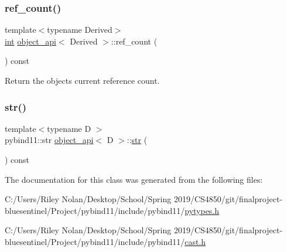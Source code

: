 \subsubsection{\texorpdfstring{ref\_count()}{ref\_count()}}
{\footnotesize\ttfamily template$<$typename Derived$>$ \\
\mbox{\hyperlink{warnings_8h_a74f207b5aa4ba51c3a2ad59b219a423b}{int}} \mbox{\hyperlink{classobject__api}{object\+\_\+api}}$<$ Derived $>$\+::ref\+\_\+count (\begin{DoxyParamCaption}{ }\end{DoxyParamCaption}) const\hspace{0.3cm}{\ttfamily [inline]}}



Return the object\textquotesingle{}s current reference count. 

\mbox{\label{classobject__api_afcae7cc760d93c39ae46192c2545f371}} 
\subsubsection{\texorpdfstring{str()}{str()}}
{\footnotesize\ttfamily template$<$typename D $>$ \\
pybind11\+::str \mbox{\hyperlink{classobject__api}{object\+\_\+api}}$<$ D $>$\+::\mbox{\hyperlink{classstr}{str}} (\begin{DoxyParamCaption}{ }\end{DoxyParamCaption}) const}



The documentation for this class was generated from the following files\+:\begin{DoxyCompactItemize}
\item 
C\+:/\+Users/\+Riley Nolan/\+Desktop/\+School/\+Spring 2019/\+C\+S4850/git/finalproject-\/bluesentinel/\+Project/pybind11/include/pybind11/\mbox{\hyperlink{pytypes_8h}{pytypes.\+h}}\item 
C\+:/\+Users/\+Riley Nolan/\+Desktop/\+School/\+Spring 2019/\+C\+S4850/git/finalproject-\/bluesentinel/\+Project/pybind11/include/pybind11/\mbox{\hyperlink{cast_8h}{cast.\+h}}\end{DoxyCompactItemize}
